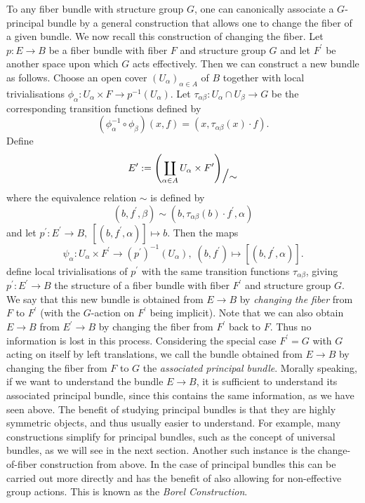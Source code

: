 To any fiber bundle with structure group $G$, one can canonically associate a $G$-principal bundle by a general construction that allows one to change the fiber of a given bundle. We now recall this construction of changing the fiber. 
Let $p \colon E \to B$ be a fiber bundle with fiber $F$ and structure group $G$ and let $F^\prime$ be another space upon which $G$ acts effectively. Then we can construct a new bundle as follows. Choose an open cover $(U_\alpha)_{\alpha \in A}$ of $B$ together with local trivialisations $\phi_\alpha \colon U_\alpha \times F \to p^{-1}(U_\alpha)$. Let $\tau_{\alpha\beta} \colon U_\alpha \cap U_\beta \to G$ be the corresponding transition functions defined by 
\[
(\phi_\alpha^{-1} \circ \phi_\beta)(x,f) = (x, \tau_{\alpha\beta}(x) \cdot f).
\]
Define 
\[
E^\prime := \left( \coprod_{\alpha \in A} U_\alpha \times F^\prime \right)_{\raisebox{5pt}{\scalebox{1.5}{$/$}}\raisebox{5pt}{\scalebox{1.05}{$\sim$}}}
\]
where the equivalence relation $\sim$ is defined by
\[
(b,f^\prime,\beta) \sim (b,\tau_{\alpha\beta}(b) \cdot f^\prime,\alpha)
\]
and let $p^\prime \colon E^\prime \to B, \: [(b,f^\prime,\alpha)] \mapsto b$. Then the maps
\[
    \psi_\alpha \colon U_\alpha \times F^\prime \to (p^\prime)^{-1}(U_\alpha), \; (b,f^\prime) \mapsto [(b,f^\prime,\alpha)].
\]
define local trivialisations of $p^\prime$ with the same transition functions $\tau_{\alpha\beta}$, giving $p^\prime \colon E^\prime \to B$ the structure of a fiber bundle with fiber $F^\prime$ and structure group $G$. We say that this new bundle is obtained from $E \to B$ by \textit{changing the fiber} from $F$ to $F^\prime$ (with the $G$-action on $F^\prime$ being implicit). Note that we can also obtain $E \to B$ from $E^\prime \to B$ by changing the fiber from $F^\prime$ back to $F$. Thus no information is lost in this process. Considering the special case $F^\prime = G$ with $G$ acting on itself by left translations, we call the bundle obtained from $E \to B$ by changing the fiber from $F$ to $G$ the \textit{associated principal bundle}. Morally speaking, if we want to understand the bundle $E \to B$, it is sufficient to understand its associated principal bundle, since this contains the same information, as we have seen above. The benefit of studying principal bundles is that they are highly symmetric objects, and thus usually easier to understand. For example, many constructions simplify for principal bundles, such as the concept of universal bundles, as we will see in the next section. Another such instance is the change-of-fiber construction from above. In the case of principal bundles this can be carried out more directly and has the benefit of also allowing for non-effective group actions. This is known as the \textit{Borel Construction}.

